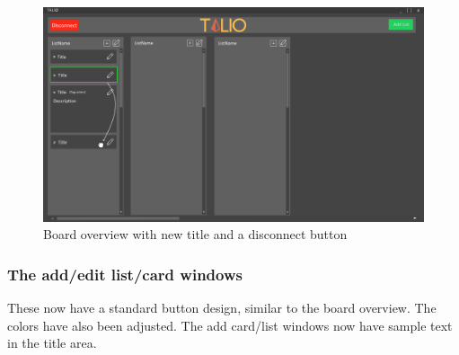 \begin{figure}
    \centering
    \includegraphics[scale=0.4]{images/UI design Board.png}
    \caption{Board overview with new title and a disconnect button}
    \label{fig:Board Overview}
\end{figure}



\subsubsection{The add/edit list/card windows}
These now have a standard button design, similar to the board overview. The colors have also been adjusted.
The add card/list windows now have sample text in the title area. 

